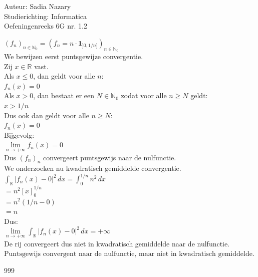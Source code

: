 \documentclass[a4paper]{article}
\begin{document}
\noindent \large Auteur: Sadia Nazary \\
\noindent \large Studierichting: Informatica\\
\noindent \large Oefeningenreeks 6G nr. 1.2\\

\medskip

\normalsize

$\left(f_n\right)_{n\in\mathbb{N}_0}
=
\left(
f_n=n\cdot\mathbf{1}_{]0,1/n]}
\right)_{n\in\mathbb{N}_0}$\\

We bewijzen eerst puntsgewijze convergentie.\\

Zij $x\in\mathbb{R}$ vast.\\

Als $x\leq0$, dan geldt voor alle $n$:\\

$f_n(x)=0$\\

Als $x>0$, dan bestaat er een $N\in\mathbb{N}_0$ zodat voor alle $n\geq N$ geldt:\\

$x>1/n$\\

Dus ook dan geldt voor alle $n\geq N$:\\

$f_n(x)=0$\\

Bijgevolg:\\

$\displaystyle \lim\limits_{n\rightarrow+\infty}f_n(x)=0$\\

Dus $\left(f_n\right)_n$ convergeert puntsgewijs naar de nulfunctie.\\

We onderzoeken nu kwadratisch gemiddelde convergentie.\\

$\displaystyle\int_{\mathbb{R}}\left|f_n(x)-0\right|^2\,dx
=
\displaystyle\int_0^{1/n}n^2\,dx$\\

$=
n^2\left[x\right]_0^{1/n}$\\

$=
n^2\left(1/n-0\right)$\\

$=
n$\\

Dus:\\

$\displaystyle \lim\limits_{n\rightarrow+\infty}
\displaystyle\int_{\mathbb{R}}\left|f_n(x)-0\right|^2\,dx
=
+\infty$\\

De rij convergeert dus niet in kwadratisch gemiddelde naar de nulfunctie.\\

$\boxed{\text{Puntsgewijs convergent naar de nulfunctie, maar niet in kwadratisch gemiddelde.}}$\\

\begin{thebibliography}{999}
\end{thebibliography}
\end{document}
